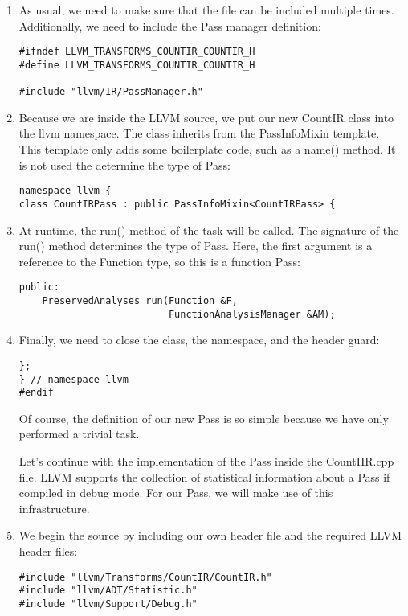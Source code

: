 \begin{enumerate}
\item As usual, we need to make sure that the file can be included multiple times. Additionally, we need to include the Pass manager definition:
\begin{lstlisting}[caption={}]
#ifndef LLVM_TRANSFORMS_COUNTIR_COUNTIR_H
#define LLVM_TRANSFORMS_COUNTIR_COUNTIR_H

#include "llvm/IR/PassManager.h"
\end{lstlisting}

\item Because we are inside the LLVM source, we put our new CountIR class into the llvm namespace. The class inherits from the PassInfoMixin template. This template only adds some boilerplate code, such as a name() method. It is not used the determine the type of Pass:
\begin{lstlisting}[caption={}]
namespace llvm {
class CountIRPass : public PassInfoMixin<CountIRPass> {
\end{lstlisting}

\item At runtime, the run() method of the task will be called. The signature of the run() method determines the type of Pass. Here, the first argument is a reference to the Function type, so this is a function Pass:
\begin{lstlisting}[caption={}]
public:
	PreservedAnalyses run(Function &F,
						  FunctionAnalysisManager &AM);
\end{lstlisting}
	
\item Finally, we need to close the class, the namespace, and the header guard:
\begin{lstlisting}[caption={}]
};
} // namespace llvm
#endif
\end{lstlisting}
Of course, the definition of our new Pass is so simple because we have only performed a trivial task.\par

Let's continue with the implementation of the Pass inside the CountIIR.cpp file. LLVM supports the collection of statistical information about a Pass if compiled in debug mode. For our Pass, we will make use of this infrastructure.\par

\item We begin the source by including our own header file and the required LLVM header files:
\begin{lstlisting}[caption={}]
#include "llvm/Transforms/CountIR/CountIR.h"
#include "llvm/ADT/Statistic.h"
#include "llvm/Support/Debug.h"
\end{lstlisting}


\end{enumerate}
